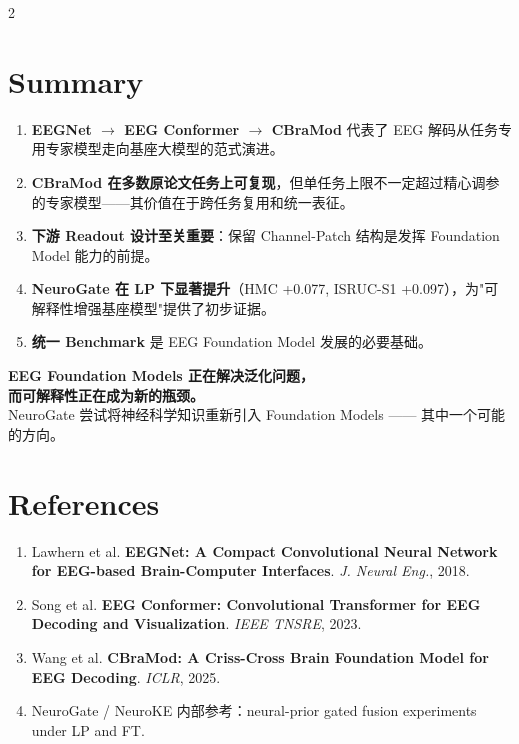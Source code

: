 \documentclass[12pt, a0paper]{article}
\renewcommand{\large}{\fontsize{28}{36}\selectfont}
\renewcommand{\LARGE}{\fontsize{40}{48}\selectfont}
\renewcommand{\footnotesize}{\fontsize{15}{20}\selectfont}
\begin{document}
\begin{multicols}{2}
\section{Summary}

\begin{enumerate}[leftmargin=2em]
    \item \textbf{EEGNet $\rightarrow$ EEG Conformer $\rightarrow$ CBraMod} 代表了 EEG 解码从任务专用专家模型走向基座大模型的范式演进。
    \item \textbf{CBraMod 在多数原论文任务上可复现}，但单任务上限不一定超过精心调参的专家模型——其价值在于跨任务复用和统一表征。
    \item \textbf{下游 Readout 设计至关重要}：保留 Channel-Patch 结构是发挥 Foundation Model 能力的前提。
    \item \textbf{NeuroGate 在 LP 下显著提升}（HMC +0.077, ISRUC-S1 +0.097），为"可解释性增强基座模型"提供了初步证据。
    \item \textbf{统一 Benchmark} 是 EEG Foundation Model 发展的必要基础。
\end{enumerate}

\vspace{0.5em}

\begin{center}
\colorbox{lightteal}{\parbox{0.95\columnwidth}{\centering
    {\LARGE\bfseries\color{myteal}
        EEG Foundation Models 正在解决泛化问题，\\[3mm]
        而可解释性正在成为新的瓶颈。}\\[3mm]
    {\large\color{myteal!80}
        NeuroGate 尝试将神经科学知识重新引入 Foundation Models —— 其中一个可能的方向。}
}}
\end{center}

\section*{References}

{\footnotesize
\begin{enumerate}[leftmargin=2em]
    \item Lawhern et al. \textbf{EEGNet: A Compact Convolutional Neural Network for EEG-based Brain-Computer Interfaces}. \textit{J. Neural Eng.}, 2018.
    \item Song et al. \textbf{EEG Conformer: Convolutional Transformer for EEG Decoding and Visualization}. \textit{IEEE TNSRE}, 2023.
    \item Wang et al. \textbf{CBraMod: A Criss-Cross Brain Foundation Model for EEG Decoding}. \textit{ICLR}, 2025.
    \item NeuroGate / NeuroKE 内部参考：neural-prior gated fusion experiments under LP and FT.
\end{enumerate}
}

\end{multicols}
\end{document}
